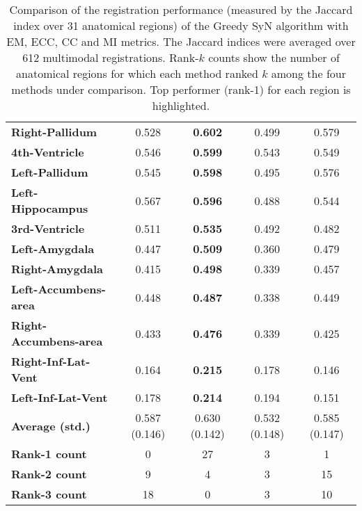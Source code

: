 \begin{table}[htbp]
{\begin{tabular}{lcccc}
    \textbf{Right-Pallidum} & 0.528 & \textbf{0.602} & 0.499 & 0.579 \\
    \textbf{4th-Ventricle} & 0.546 & \textbf{0.599} & 0.543 & 0.549 \\
    \textbf{Left-Pallidum} & 0.545 & \textbf{0.598} & 0.495 & 0.576 \\
    \textbf{Left-Hippocampus} & 0.567 & \textbf{0.596} & 0.488 & 0.544 \\
    \textbf{3rd-Ventricle} & 0.511 & \textbf{0.535} & 0.492 & 0.482 \\
    \textbf{Left-Amygdala} & 0.447 & \textbf{0.509} & 0.360 & 0.479 \\
    \textbf{Right-Amygdala} & 0.415 & \textbf{0.498} & 0.339 & 0.457 \\
    \textbf{Left-Accumbens-area} & 0.448 & \textbf{0.487} & 0.338 & 0.449 \\
    \textbf{Right-Accumbens-area} & 0.433 & \textbf{0.476} & 0.339 & 0.425 \\
    \textbf{Right-Inf-Lat-Vent} & 0.164 & \textbf{0.215} & 0.178 & 0.146 \\
    \textbf{Left-Inf-Lat-Vent} & 0.178 & \textbf{0.214} & 0.194 & 0.151 \\
    \hline
    \textbf{Average (std.)} & 0.587 (0.146) & 0.630 (0.142) & 0.532 (0.148) & 0.585 (0.147) \\
    \textbf{Rank-1 count} & 0 & 27 & 3 & 1 \\
    \textbf{Rank-2 count} & 9 & 4 & 3 & 15 \\
    \textbf{Rank-3 count} & 18 & 0 & 3 & 10 \\
    \bottomrule
    \end{tabular}}%
    \caption{Comparison of the registration performance (measured by the Jaccard index over 31 anatomical regions) of the Greedy SyN algorithm with EM, ECC, CC and MI metrics.
The Jaccard indices were averaged over 612 multimodal registrations. Rank-$k$ counts show the number of anatomical regions for which each
method ranked $k$ among the four methods under comparison. Top performer (rank-1) for each region is highlighted.}
  \label{tab:multimodal_results_seg}%
\end{table}%
